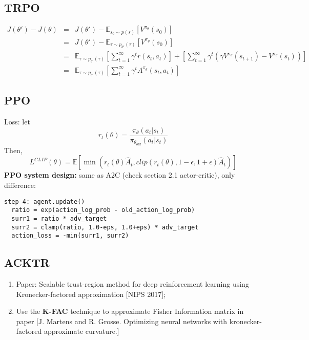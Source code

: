 \documentclass{article}
\begin{document}
\subsection{TRPO}
\begin{eqnarray*}
J(\theta')-J(\theta)&=&J(\theta')-\mathbb{E}_{s_0\sim p(s)}[V^{\pi_{\theta}}(s_0)]\\
&=&J(\theta')-\mathbb{E}_{\tau\sim p_{\theta'}(\tau)}[V^{\pi_{\theta}}(s_0)]\\
&=&\mathbb{E}_{\tau\sim p_{\theta'}(\tau)}[\sum_{t=1}^{\infty}\gamma^t r(s_t, a_t)]+[\sum_{t=1}^{\infty}\gamma^t(\gamma V^{\pi_{\theta}}(s_{t+1})-V^{\pi_{\theta}}(s_t))]\\
&=&\mathbb{E}_{\tau\sim p_{\theta'}(\tau)}[\sum_{t=1}^{\infty}\gamma^t A^{\pi_{\theta}}(s_t, a_t)]
\end{eqnarray*}

\subsection{PPO}
Loss: let 
\begin{equation*}
r_t(\theta)=\frac{\pi_{\theta}(a_t|s_t)}{\pi_{\theta_{old}}(a_t|s_t)}
\end{equation*}
Then,
\begin{equation}
L^{CLIP}(\theta)=\mathbb{E}[\min(r_t(\theta)\hat{A}_t, clip(r_t(\theta), 1-\epsilon, 1+\epsilon)\hat{A}_t)]
\end{equation}
\textbf{PPO system design:} same as A2C (check section 2.1 actor-critic), only difference:
\begin{verbatim}
step 4: agent.update()
  ratio = exp(action_log_prob - old_action_log_prob)
  surr1 = ratio * adv_target
  surr2 = clamp(ratio, 1.0-eps, 1.0+eps) * adv_target
  action_loss = -min(surr1, surr2) 
\end{verbatim}

\subsection{ACKTR}
\begin{enumerate}
\item Paper: Scalable trust-region method for deep reinforcement learning using Kronecker-factored approximation [NIPS 2017];
\item Use the \textbf{K-FAC} technique to approximate Fisher Information matrix in paper [J. Martens and R. Grosse. Optimizing neural networks with kronecker-factored approximate curvature.]
\end{enumerate}
\end{document}
